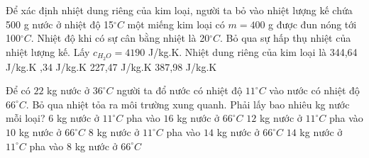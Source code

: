 \begin{vidu}%
	Để xác định nhiệt dung riêng của kim loại, người ta bỏ vào nhiệt lượng kế chứa 500 g nước ở nhiệt độ 15$^{\circ}C$ một miếng kim loại có $m=400$ g được đun nóng tới 100$^{\circ}C$. Nhiệt độ khi có sự cân bằng nhiệt là 20$^{\circ}C$. Bỏ qua sự hấp thụ nhiệt của nhiệt lượng kế. Lấy $c_{H_2O}=4190$ J/kg.K. Nhiệt dung riêng của kim loại là
	\choice
	{344,64 J/kg.K}
	{,34 J/kg.K}
	{227,47 J/kg.K}
	{387,98 J/kg.K}
	\end{vidu}

	
\begin{vidu}%
	Để có $22$ kg nước ở $36^{\circ}C$ người ta đổ nước có nhiệt độ $11^{\circ}C$ vào nước có nhiệt độ $66^{\circ}C$. Bỏ qua nhiệt tỏa ra môi trường xung quanh. Phải lấy bao nhiêu kg nước mỗi loại? 
	\choice
	{$6$ kg nước ở $11^{\circ}C$ pha vào $16$ kg nước ở $66^{\circ}C$}
	{\True $12$ kg nước ở $11^{\circ}C$ pha vào $10$ kg nước ở $66^{\circ}C$}
	{$8$ kg nước ở $11^{\circ}C$ pha vào $14$ kg nước ở $66^{\circ}C$}
	{$14$ kg nước ở $11^{\circ}C$ pha vào $8$ kg nước ở $66^{\circ}C$}
	\end{vidu}


